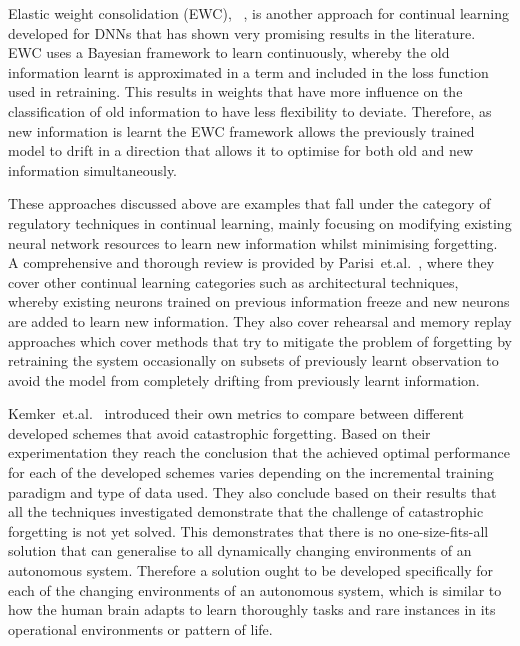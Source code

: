 Elastic weight consolidation (EWC), ~\cite{Kirkpatrick2017}, is another approach for continual learning developed for DNNs that has shown very promising results in the literature.
%
EWC uses a Bayesian framework to learn continuously, whereby the old information learnt is approximated in a term and included in the loss function used in retraining.  
%
This results in weights that have more influence on the classification of old information to 
have less flexibility to deviate.  Therefore, as new information is learnt the EWC framework allows the previously trained model to drift in a direction that allows it to optimise for both old and new information simultaneously.   

These approaches discussed above are examples that fall under the category of regulatory techniques in continual learning, mainly focusing on modifying existing neural network resources to learn new information whilst minimising forgetting.
%
A comprehensive and thorough review is provided by Parisi~et.al.~\cite{Parisi2019}, where they cover other continual learning categories such as architectural techniques, whereby existing neurons trained on previous information freeze and new neurons are added to learn new information.
%
They also cover rehearsal and memory replay approaches which cover methods that try to mitigate the problem of forgetting by retraining the system occasionally on subsets of previously learnt observation to avoid the model from completely drifting from previously learnt information. 

Kemker~et.al.~\cite{Kemker2018a} introduced their own metrics to compare between different developed schemes that avoid catastrophic forgetting.
%
Based on their experimentation they reach the conclusion that the achieved optimal performance for each of the developed schemes varies depending on the incremental training paradigm and type of data used. 
%
They also conclude based on their results that all the techniques investigated demonstrate that the challenge of catastrophic forgetting is not yet solved.
%
This demonstrates that there is no one-size-fits-all solution that can generalise to all dynamically changing environments of an autonomous system.  
%
Therefore a solution ought to be developed specifically for each of the changing environments of an autonomous system, which is similar to how the human brain adapts to learn thoroughly tasks and rare instances in its operational environments or pattern of life. 

